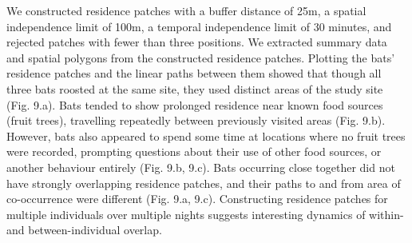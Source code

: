 \documentclass[10pt,paper=a4,headings=standardclasses
]{scrartcl}
\begin{document}
We constructed residence patches with a buffer distance of 25m, a spatial independence limit of 100m, a temporal independence limit of 30 minutes, and rejected patches with fewer than three positions.
We extracted summary data and spatial polygons from the constructed residence patches.
Plotting the bats' residence patches and the linear paths between them showed that though all three bats roosted at the same site, they used distinct areas of the study site (Fig. 9.a).
Bats tended to show prolonged residence near known food sources (fruit trees), travelling repeatedly between previously visited areas (Fig. 9.b).
However, bats also appeared to spend some time at locations where no fruit trees were recorded, prompting questions about their use of other food sources, or another behaviour entirely (Fig. 9.b, 9.c).
Bats occurring close together did not have strongly overlapping residence patches, and their paths to and from area of co-occurrence were different (Fig. 9.a, 9.c).
Constructing residence patches for multiple individuals over multiple nights suggests interesting dynamics of within- and between-individual overlap.
\end{document}
